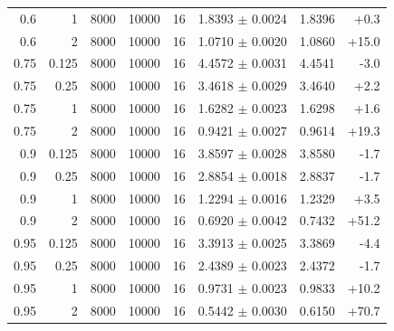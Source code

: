 {\begin{longtable}[]{@{}rrrrrrrr@{}}
0.6 & 1 & 8000 & 10000 & 16 & 1.8393 $\pm$ 0.0024 & 1.8396 & +0.3 \\
0.6 & 2 & 8000 & 10000 & 16 & 1.0710 $\pm$ 0.0020 & 1.0860 & +15.0 \\
0.75 & 0.125 & 8000 & 10000 & 16 & 4.4572 $\pm$ 0.0031 & 4.4541 & -3.0 \\
0.75 & 0.25 & 8000 & 10000 & 16 & 3.4618 $\pm$ 0.0029 & 3.4640 & +2.2 \\
0.75 & 1 & 8000 & 10000 & 16 & 1.6282 $\pm$ 0.0023 & 1.6298 & +1.6 \\
0.75 & 2 & 8000 & 10000 & 16 & 0.9421 $\pm$ 0.0027 & 0.9614 & +19.3 \\
0.9 & 0.125 & 8000 & 10000 & 16 & 3.8597 $\pm$ 0.0028 & 3.8580 & -1.7 \\
0.9 & 0.25 & 8000 & 10000 & 16 & 2.8854 $\pm$ 0.0018 & 2.8837 & -1.7 \\
0.9 & 1 & 8000 & 10000 & 16 & 1.2294 $\pm$ 0.0016 & 1.2329 & +3.5 \\
0.9 & 2 & 8000 & 10000 & 16 & 0.6920 $\pm$ 0.0042 & 0.7432 & +51.2 \\
0.95 & 0.125 & 8000 & 10000 & 16 & 3.3913 $\pm$ 0.0025 & 3.3869 & -4.4 \\
0.95 & 0.25 & 8000 & 10000 & 16 & 2.4389 $\pm$ 0.0023 & 2.4372 & -1.7 \\
0.95 & 1 & 8000 & 10000 & 16 & 0.9731 $\pm$ 0.0023 & 0.9833 & +10.2 \\
0.95 & 2 & 8000 & 10000 & 16 & 0.5442 $\pm$ 0.0030 & 0.6150 & +70.7 \\
\end{longtable}
}

